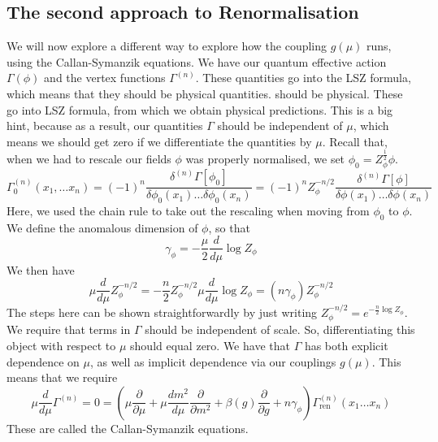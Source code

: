 \documentclass[11pt, oneside]{article}   	%
\theoremstyle{slanted}
\begin{document}
\subsection{The second approach to Renormalisation}
We will now explore 
a different way to explore how the 
coupling $ g \left(  \mu  \right)  $  runs, 
using the Callan-Symanzik equations.
We have our quantum effective 
action $ \Gamma \left( \phi  \right) $ and the vertex functions 
$ \Gamma ^{ \left(  n  \right)  }  $. 
These quantities go into the LSZ formula, which 
means that they should be physical quantities. 
should be physical. These go into LSZ formula, 
from which we obtain physical predictions. This is a 
big hint, because as a result, our quantities 
$ \Gamma $ should be independent of $ \mu $, 
which means we should get zero if we differentiate 
the quantities by $ \mu $. 
Recall that, when we had to rescale our 
fields $ \phi $ was properly normalised, 
we set $ \phi _ 0 = Z_{ \phi } ^{\frac{1}{2}} \phi $. 
\[
\Gamma _ 0 ^{ \left(  n  \right)  }
\left( x_1, \dots x _ n  \right)   = 
\left(  - 1  \right)  ^{ n } \frac{\delta ^{ \left( n  \right)  } 
\Gamma \left[  \phi _ 0  \right]  }{ \delta 
\phi _ 0 \left( x _ 1  \right)  \dots \delta \phi _ 0 \left( x _ n  \right)  }
= \left(  - 1  \right)  ^{ n } Z ^{  - n / 2 } _ \phi 
\frac{\delta ^{ \left( n  \right)  } \Gamma \left[  \phi  \right]  }{ 
\delta \phi \left( x _ 1  \right)  \dots \delta \phi \left(  x_ n  \right)  }
\] Here, we used the 
chain rule to take out the rescaling when 
moving from $ \phi _ 0 $ to $ \phi $. We define 
the anomalous dimension of $ \phi $, 
so that 
\[
\gamma _{ \phi }  = - \frac{ \mu }{ 2 } \frac{d  }{ d \mu } 
\log Z _{ \phi} 
\] We then 
have 
\[
\mu \frac{ d  }{ d \mu  } Z _{ \phi } ^{  - n  / 2} = 
- \frac{n}{ 2 } Z _{ \phi } ^{  - n  / 2 } \mu 
\frac{ d }{ d \mu } \log Z_{ \phi }  = \left( n 
\gamma _{ \phi } \right)  Z _{ \phi } ^{  - n  / 2 }
\] The steps here can 
be shown straightforwardly by just writing 
$ Z _ \phi ^{ - n / 2 }  = e ^{  - \frac{n}{2 } \log Z _ \phi } $. 
We require that terms 
in $ \Gamma $ should be independent of scale.
So, differentiating this object with respect to 
$ \mu $ should equal zero. We have that $ \Gamma $ has 
both explicit dependence on $ \mu $, as 
well as implicit dependence via our couplings 
$ g \left( \mu  \right)  $. 
This means that we require 
\[
\mu \frac{d }{ d \mu } \Gamma ^{ \left( n  \right)  } 
 = 0 = \left( \mu \frac{\partial   }{\partial  \mu }  
 + \mu \frac{d m ^ 2 }{ d \mu } \frac{\partial  }{\partial  m ^ 2 }  
+ \beta \left( g  \right) \frac{\partial  }{\partial  g }  
+ n \gamma _{ \phi }  \right)  \Gamma_{\text{ren}}^{ \left( n  \right)  }  
\left( x_1 \dots x _n  \right) 
\] These are called the Callan-Symanzik equations. 
\end{document}
